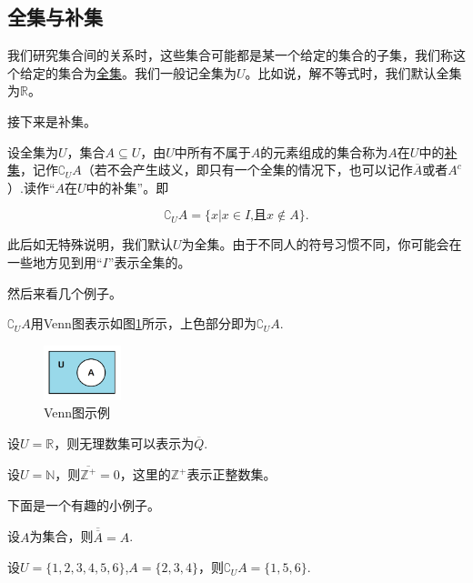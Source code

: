 \documentclass[lang=cn,math=cm,chinesefont=nofont,11pt,scheme=chinese,onecol]{elegantbook}
\begin{document}
\subsection{全集与补集}
  我们研究集合间的关系时，这些集合可能都是某一个给定的集合的子集，我们称这个给定的集合为\underline{全集}。我们一般记全集为$U$。比如说，解不等式时，我们默认全集为$\mathbb{R}$。

  接下来是补集。
\begin{definition}
  设全集为$U$，集合$A\subseteq U$，由$U$中所有不属于$A$的元素组成的集合称为$A$在$U$中的\underline{补集}，记作${\complement}_{U}A$（若不会产生歧义，即只有一个全集的情况下，也可以记作$\overline{A}$或者$A^c$）.读作“$A$在$U$中的补集”。即

  $${\complement}_{U}A=\{x|x\in I\text{,且}x\notin A\}.$$
\end{definition}
\begin{remark}
  此后如无特殊说明，我们默认$U$为全集。由于不同人的符号习惯不同，你可能会在一些地方见到用“$I$”表示全集的。
\end{remark}
  然后来看几个例子。
\begin{example}
  $\complement_{U}A$用Venn图表示如图\ref{img:Venn3}所示，上色部分即为$\complement_{U}A$.
\end{example}
\begin{figure}[h]
  \centering
  \includegraphics[width=0.2\textwidth]{image/Venn3.png}
  \caption{Venn图示例}
  \label{img:Venn3}
\end{figure}

\begin{example}
  设$U=\mathbb{R}$，则无理数集可以表示为$\overline{Q}$.
\end{example}

\begin{example}
  设$U=\mathbb{N}$，则$\overline{\mathbb{Z}^+}={0}$，这里的$\mathbb{Z}^+$表示正整数集。
\end{example}

下面是一个有趣的小例子。

\begin{example}
  设$A$为集合，则$\overline{\overline{A}}=A$.
\end{example}

\begin{example}
  设$U=\{1,2,3,4,5,6\}$,$A=\{2,3,4\}$，则$\complement_{U}A=\{1,5,6\}.$
\end{example}
\end{document}
